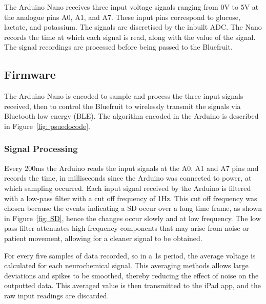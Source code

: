 The Arduino Nano receives three input voltage signals ranging from 0V to 5V at the analogue pins A0, A1, and A7. These input pins correspond to glucose, lactate, and potassium. The signals are discretised by the inbuilt ADC. The Nano records the time at which each signal is read, along with the value of the signal. The signal recordings are processed before being passed to the Bluefruit.



\subsection{Firmware}
The Arduino Nano is encoded to sample and process the three input signals received, then to control the Bluefruit to wirelessly transmit the signals via Bluetooth low energy (BLE). The algorithm encoded in the Arduino is described in Figure~\ref{fig: psuedocode}.


\subsubsection{Signal Processing}
Every 200ms the Arduino reads the input signals at the A0, A1 and A7 pins and records the time, in milliseconds since the Arduino was connected to power, at which sampling occurred. Each input signal received by the Arduino is filtered with a low-pass filter with a cut off frequency of 1Hz. This cut off frequency was chosen because the events indicating a SD occur over a long time frame, as shown in Figure~\ref{fig: SD}, hence the changes occur slowly and at low frequency. The low pass filter attenuates high frequency components that may arise from noise or patient movement, allowing for a cleaner signal to be obtained.

For every five samples of data recorded, so in a 1s period, the average voltage is calculated for each neurochemical signal. This averaging methods allows large deviations and spikes to be smoothed, thereby reducing the effect of noise on the outputted data. This averaged value is then transmitted to the iPad app, and the raw input readings are discarded.

